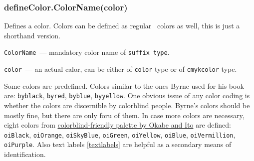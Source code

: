 

\subsubsection{defineColor.ColorName(color)}\label{defineColor}
	
	Defines a color. Colors can be defined as regular \METAPOST\ colors as well, this is just a shorthand version.

	\texttt{ColorName}~— mandatory color name of \texttt{suffix type}.
	
	\texttt{color}~— an actual calor, can be either of \texttt{color} type or of \texttt{cmykcolor} type.
	
	Some colors are predefined. Colors similar to the ones Byrne used for his book are: \texttt{byblack}, \texttt{byred}, \texttt{byblue}, \texttt{byyellow}. One obvious issue of any color coding is whether the colors are discernible by colorblind people. Byrne's colors should be mostly fine, but there are only foru of them. In case more colors are necessary, eight colors from \href{https://jfly.uni-koeln.de/color/}{colorblind-friendly palette by Okabe and Ito} \cite{Okabi2008} are defined: \texttt{oiBlack}, \texttt{oiOrange}, \texttt{oiSkyBlue}, \texttt{oiGreen}, \texttt{oiYellow}, \texttt{oiBlue}, \texttt{oiVermillion}, \texttt{oiPurple}. Also text labels \ref{textlabels} are helpful as a secondary means of identification.

	

	

